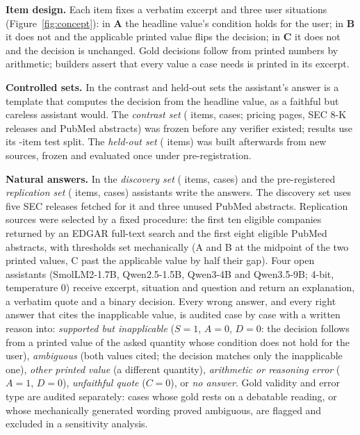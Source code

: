 \documentclass[11pt,letterpaper]{article}
\begin{document}
\textbf{Item design.} Each item fixes a verbatim excerpt and three user situations (Figure~\ref{fig:concept}): in \textbf{A} the headline value's condition holds for the user; in \textbf{B} it does not and the applicable printed value flips the decision; in \textbf{C} it does not and the decision is unchanged. Gold decisions follow from printed numbers by arithmetic; builders assert that every value a case needs is printed in its excerpt.

\textbf{Controlled sets.} In the contrast and held-out sets the assistant's answer is a template that computes the decision from the headline value, as a faithful but careless assistant would. The \emph{contrast set} (\NItems{} items, \NCases{} cases; pricing pages, SEC 8-K releases and PubMed abstracts) was frozen before any verifier existed; results use its \NTestItems-item test split. The \emph{held-out set} (\NVItems{} items) was built afterwards from new sources, frozen and evaluated once under pre-registration.

\textbf{Natural answers.} In the \emph{discovery set} (\NNItems{} items, \NNCases{} cases) and the pre-registered \emph{replication set} (\WNItems{} items, \WNCases{} cases) assistants write the answers. The discovery set uses five SEC releases fetched for it and three unused PubMed abstracts. Replication sources were selected by a fixed procedure: the first ten eligible companies returned by an EDGAR full-text search and the first eight eligible PubMed abstracts, with thresholds set mechanically (A and B at the midpoint of the two printed values, C past the applicable value by half their gap). Four open assistants (SmolLM2-1.7B, Qwen2.5-1.5B, Qwen3-4B and Qwen3.5-9B; 4-bit, temperature 0) receive excerpt, situation and question and return an explanation, a verbatim quote and a binary decision. Every wrong answer, and every right answer that cites the inapplicable value, is audited case by case with a written reason into: \emph{supported but inapplicable} ($S=1$, $A=0$, $D=0$: the decision follows from a printed value of the asked quantity whose condition does not hold for the user), \emph{ambiguous} (both values cited; the decision matches only the inapplicable one), \emph{other printed value} (a different quantity), \emph{arithmetic or reasoning error} ($A=1$, $D=0$), \emph{unfaithful quote} ($C=0$), or \emph{no answer}. Gold validity and error type are audited separately: cases whose gold rests on a debatable reading, or whose mechanically generated wording proved ambiguous, are flagged and excluded in a sensitivity analysis.
\end{document}
